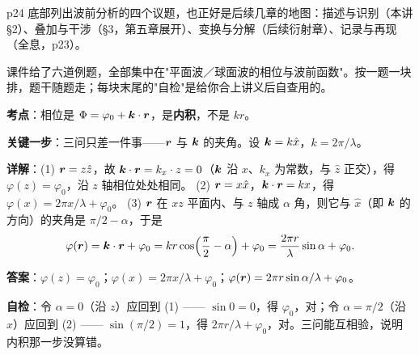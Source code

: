 \documentclass[10pt]{ctexart}
\renewcommand{\qbreak}{\needspace{0.55\textheight}}
\begin{document}

p24 底部列出波前分析的四个议题，也正好是后续几章的地图：描述与识别（本讲 §2）、叠加与干涉（§3，第五章展开）、变换与分解（后续衍射章）、记录与再现（全息，p23）。


课件给了六道例题，全部集中在"平面波／球面波的相位与波前函数"。按一题一块排，题干随题走；每块末尾的"自检"是给你合上讲义后自查用的。

\qbreak
{}

\textbf{考点}：相位是 $\Phi=\varphi_0+\boldsymbol{k}\cdot\boldsymbol{r}$，是\textbf{内积}，不是 $kr$。

\textbf{关键一步}：三问只差一件事——$\boldsymbol{r}$ 与 $\boldsymbol{k}$ 的夹角。设 $\boldsymbol{k}=k\hat x$，$k=2\pi/\lambda$。

\textbf{详解}：(1) $\boldsymbol{r}=z\hat z$，故 $\boldsymbol{k}\cdot\boldsymbol{r}=k_x\cdot z=0$（$\boldsymbol{k}$ 沿 $x$、$k_x$ 为常数，与 $\hat z$ 正交），得 $\varphi(z)=\varphi_0$，沿 $z$ 轴相位处处相同。
(2) $\boldsymbol{r}=x\hat x$，$\boldsymbol{k}\cdot\boldsymbol{r}=kx$，得 $\varphi(x)=2\pi x/\lambda+\varphi_0$。
(3) $\boldsymbol{r}$ 在 $xz$ 平面内、与 $z$ 轴成 $\alpha$ 角，则它与 $\hat x$（即 $\boldsymbol{k}$ 的方向）的夹角是 $\pi/2-\alpha$，于是
\[
\varphi(\boldsymbol{r})=\boldsymbol{k}\cdot\boldsymbol{r}+\varphi_0
=kr\cos\!\left(\frac{\pi}{2}-\alpha\right)+\varphi_0
=\frac{2\pi r}{\lambda}\sin\alpha+\varphi_0 .
\]

\textbf{答案}：$\varphi(z)=\varphi_0$；$\varphi(x)=2\pi x/\lambda+\varphi_0$；$\varphi(\boldsymbol{r})=2\pi r\sin\alpha/\lambda+\varphi_0$。

\textbf{自检}：令 $\alpha=0$（沿 $z$）应回到 (1) —— $\sin0=0$，得 $\varphi_0$，对；令 $\alpha=\pi/2$（沿 $x$）应回到 (2) —— $\sin(\pi/2)=1$，得 $2\pi r/\lambda+\varphi_0$，对。三问能互相验，说明内积那一步没算错。

\qbreak
{}
\end{document}
